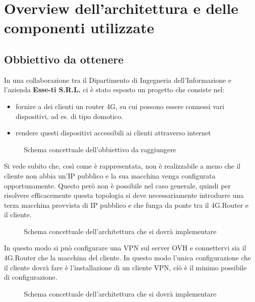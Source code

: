 

\chapter{Overview dell'architettura e delle componenti utilizzate}
\setlength{\parskip}{1em}
\setlength{\parindent}{0em}
\renewcommand{\baselinestretch}{1.15}

\label{ch:1}

\section{Obbiettivo da ottenere}

In una collaborazione tra il Dipartimento di Ingegneria dell'Informazione e l'azienda \textbf{Esse-ti S.R.L.} ci \`e stato esposto un progetto che consiste nel:
\begin{itemize}
    \item fornire a dei clienti un router 4G, su cui possono essere connessi vari dispositivi, ad es. di tipo domotico.
    \item rendere questi dispositivi accessibili ai clienti attraverso internet 
\end{itemize}

\begin{figure}[ht]
	\centering
	
	\caption{Schema concettuale dell'obbiettivo da raggiungere}

	
\end{figure}

Si vede subito che, cos\`i come \`e rappresentata, non \`e realizzabile a meno che il cliente non abbia un'IP pubblico e la sua macchina venga configurata opportunamente. Questo per\`o non \`e possibile nel caso generale, quindi per risolvere efficacemente questa topologia si deve necessariamente introdurre una terza macchina provvista di IP pubblico e che funga da ponte tra il 4G.Router e il cliente.

\begin{figure}[ht]
	\centering
	
	\caption{Schema concettuale dell'architettura che si dovr\`a implementare}

	
\end{figure}

In questo modo si pu\`o configurare una VPN sul server OVH e connettervi sia il 4G.Router che la macchina del cliente. In questo modo l'unica configurazione che il cliente dovr\`a fare \`e l'installazione di un cliente VPN, ci\`o \`e il minimo possibile di configurazione.

\begin{figure}[ht]
	\centering
	
	\caption{Schema concettuale dell'architettura che si dovr\`a implementare}

	
\end{figure}

